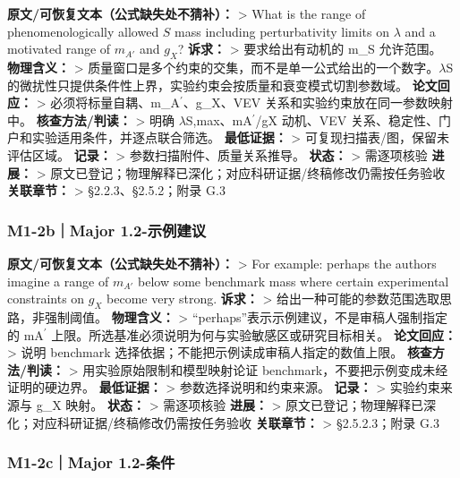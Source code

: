 \documentclass[
  chinese,
  UTF8]{ctexart}
\begin{document}
\textbf{原文/可恢复文本（公式缺失处不猜补）：} \textgreater{} What is
the range of phenomenologically allowed \(S\) mass including
perturbativity limits on \(\lambda\) and a motivated range of \(m_{A'}\)
and \(g_X\)? \textbf{诉求：} \textgreater{} 要求给出有动机的 m\_S
允许范围。 \textbf{物理含义：} \textgreater{}
质量窗口是多个约束的交集，而不是单一公式给出的一个数字。\ensuremath{\lambda}S
的微扰性只提供条件性上界，实验约束会按质量和衰变模式切割参数域。
\textbf{论文回应：} \textgreater{}
必须将标量自耦、m\_A\ensuremath{^\prime}、g\_X、VEV
关系和实验约束放在同一参数映射中。 \textbf{核查方法/判读：}
\textgreater{} 明确 \ensuremath{\lambda}S,max、mA\ensuremath{^\prime}/gX
动机、VEV 关系、稳定性、门户和实验适用条件，并逐点联合筛选。
\textbf{最低证据：} \textgreater{} 可复现扫描表/图，保留未评估区域。
\textbf{记录：} \textgreater{} 参数扫描附件、质量关系推导。
\textbf{状态：} \textgreater{} 需逐项核验 \textbf{进展：} \textgreater{}
原文已登记；物理解释已深化；对应科研证据/终稿修改仍需按任务验收
\textbf{关联章节：} \textgreater{} §2.2.3、§2.5.2；附录 G.3

\subsubsection{M1-2b｜Major
1.2-示例建议}\label{m1-2bmajor-1.2-ux793aux4f8bux5efaux8bae}

\textbf{原文/可恢复文本（公式缺失处不猜补）：} \textgreater{} For
example: perhaps the authors imagine a range of \(m_{A'}\) below some
benchmark mass where certain experimental constraints on \(g_X\) become
very strong. \textbf{诉求：} \textgreater{}
给出一种可能的参数范围选取思路，非强制阈值。 \textbf{物理含义：}
\textgreater{} ``perhaps''表示示例建议，不是审稿人强制指定的
mA\ensuremath{^\prime}
上限。所选基准必须说明为何与实验敏感区或研究目标相关。
\textbf{论文回应：} \textgreater{} 说明 benchmark
选择依据；不能把示例读成审稿人指定的数值上限。 \textbf{核查方法/判读：}
\textgreater{} 用实验原始限制和模型映射论证
benchmark，不要把示例变成未经证明的硬边界。 \textbf{最低证据：}
\textgreater{} 参数选择说明和约束来源。 \textbf{记录：} \textgreater{}
实验约束来源与 g\_X 映射。 \textbf{状态：} \textgreater{} 需逐项核验
\textbf{进展：} \textgreater{}
原文已登记；物理解释已深化；对应科研证据/终稿修改仍需按任务验收
\textbf{关联章节：} \textgreater{} §2.5.2.3；附录 G.3

\subsubsection{M1-2c｜Major 1.2-条件}\label{m1-2cmajor-1.2-ux6761ux4ef6}
\end{document}
